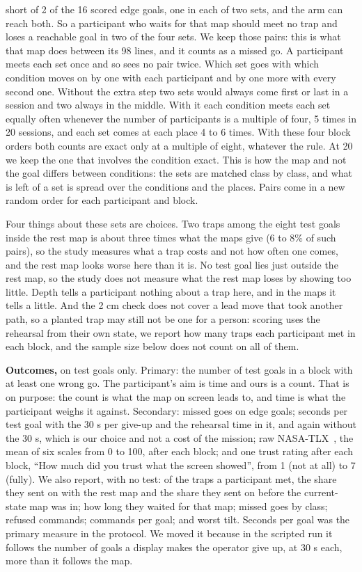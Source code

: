 \documentclass[pdflatex,sn-mathphys-num]{sn-jnl}
\begin{document}
short of 2 of the 16 scored edge goals, one in each of two sets, and the arm can reach both. So a participant
who waits for that map should meet no trap and loses a reachable goal in two of the four sets. We keep those
pairs: this is what that map does between its 98 lines, and it counts as a missed go. %
A participant meets each set once and so sees no pair twice. Which set goes with which condition moves on by one
with each participant and by one more with every second one. Without the extra step two sets would always come first
or last in a session and two always in the middle. With it each condition meets each set equally often whenever the
number of participants is a multiple of four, 5 times in 20 sessions, and each set comes at each place 4 to 6
times. With these four block orders both counts are exact only at a multiple of eight, whatever the rule. At 20 we
keep the one that involves the condition exact. %
This is how the map and not the goal differs between
conditions: the sets are matched class by class, and what is left of a set is spread over the conditions and the
places. Pairs come in a new random order for each participant and block.

Four things about these sets are choices. Two traps among the eight test goals inside the rest map is about
three times what the maps give (6 to 8\% of such pairs), so the study measures what a trap costs and not how
often one comes, and the rest map looks worse here than it is. %
No test goal lies just outside the rest map, so the study does not measure what the rest map loses by showing too
little. Depth tells a participant nothing about a trap here, and in the maps it tells a little. And the 2 cm
check does not cover a lead move that took another path, so a planted trap may still not be one for a person:
scoring uses the rehearsal from their own state, we report how many traps each participant met in each block,
and the sample size below does not count on all of them.

\textbf{Outcomes,} on test goals only. Primary: the number of test goals in a block with at least one wrong go.
The participant's aim is time and ours is a count. That is on purpose: the count is what the map on screen leads
to, and time is what the participant weighs it against. Secondary: missed goes on edge goals; seconds per test
goal with the 30 s per give-up and the rehearsal time in it, and again without the 30 s, which is our choice and
not a cost of the mission; %
raw NASA-TLX~\cite{hart1988}, the mean of six scales from 0 to 100, after each block; and one trust rating after
each block, ``How much did you trust what the screen showed'', from 1 (not at all) to 7 (fully). We also report,
with no test: of the traps a participant met, the share they sent on with the rest map and the share they sent
on before the current-state map was in; how long they waited for that map; missed goes by class; refused
commands; commands per goal; and worst tilt. Seconds per goal was the primary measure in the protocol. We moved
it because in the scripted run it follows the number of goals a display makes the operator give up, at 30 s
each, more than it follows the map.
\end{document}

